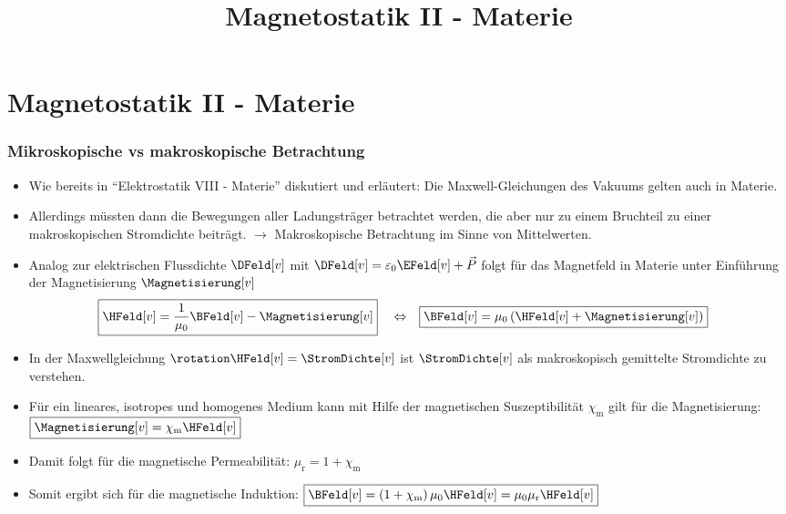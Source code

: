 

\title[TET: Magnetostatik II - Materie]{Magnetostatik II - Materie}


% 
% 

\maketitle

% 
% 
\section{Magnetostatik II - Materie}

\begin{frame}

  \frametitle{Mikroskopische vs makroskopische Betrachtung}

  \begin{itemize}[<+->]
  \item Wie bereits in \enquote{Elektrostatik VIII - Materie} diskutiert und erläutert: Die Maxwell-Gleichungen des Vakuums gelten auch in Materie.
  \item Allerdings müssten dann die \alert{Bewegungen aller Ladungsträger} betrachtet werden, die aber nur zu einem Bruchteil zu einer \alert{makroskopischen Stromdichte} beiträgt. $\to$ Makroskopische Betrachtung im Sinne von Mittelwerten.
    \item Analog zur elektrischen Flussdichte \(\DFeld[v] \) mit
$\DFeld[v] = \varepsilon_0 \EFeld[v] + \vec{P}$
folgt für das Magnetfeld in Materie unter Einführung der \alert{Magnetisierung} \(\Magnetisierung[v] \)
\begin{align*}
	& \boxed{\HFeld[v] = \dfrac{1}{\mu_0} \BFeld[v] - \Magnetisierung[v]}
		&& \Leftrightarrow
		&&	\boxed{\BFeld[v] = \mu_0  \left( \HFeld[v] + \Magnetisierung[v] \right)}
\end{align*}
\item In der Maxwellgleichung $\rotation \HFeld[v] = \StromDichte[v]$
ist $\StromDichte[v]$ als \alert{makroskopisch gemittelte Stromdichte} zu verstehen.
\item Für ein \alert{lineares, isotropes und homogenes Medium} kann mit Hilfe der \alert{magnetischen Suszeptibilität} \(\chi_\mathrm{m} \) gilt für die Magnetisierung:$\boxed{\Magnetisierung[v] = \chi_\mathrm{m}  \HFeld[v]}$
\item Damit folgt für die magnetische Permeabilität:
$\boxed{\mu_\mathrm{r} = 1 + \chi_\mathrm{m} }$
\item Somit ergibt sich für die magnetische Induktion:
$\boxed{\BFeld[v] = \left( 1 + \chi_\mathrm{m} \right) \mu_0 \HFeld[v]
		= \mu_0 \mu_\mathrm{r} \HFeld[v] }$
\end{itemize}
\end{frame}

